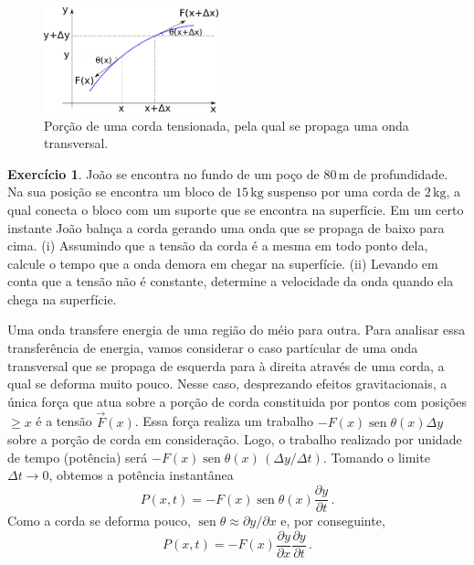 \documentclass[twocolumn=on,fontsize=12pt,DIV=calc]{scrartcl}
\theoremstyle{definition}
\newtheorem{ex}{Exercício}[section]
\DeclareMathOperator{\sen}{sen}
\begin{document}
\begin{figure}[ht]
  \centering
  \includegraphics[width=0.45\textwidth,keepaspectratio]{aux/ondavelocidade.pdf}
  \caption{Porção de uma corda tensionada, pela qual se propaga uma
    onda transversal.}
  \label{fig:ondavelocidade}
\end{figure}

\begin{ex}
  \label{ex:ondapoco}
  João se encontra no fundo de um poço de $80\,\mathrm{m}$ de
  profundidade. Na sua posição se encontra um bloco de
  $15\,\mathrm{kg}$ suspenso por uma corda de $2\,\mathrm{kg}$, a qual
  conecta o bloco com um suporte que se encontra na superfície. Em um
  certo instante João balnça a corda gerando uma onda que se propaga
  de baixo para cima. (i) Assumindo que a tensão da corda é a mesma em
  todo ponto dela, calcule o tempo que a onda demora em chegar na
  superfície. (ii) Levando em conta que a tensão não é constante,
  determine a velocidade da onda quando ela chega na superfície.
\end{ex}

Uma onda transfere energia de uma região do méio para outra. Para
analisar essa transferência de energia, vamos considerar o caso
partícular de uma onda transversal que se propaga de esquerda para à
direita através de uma corda, a qual se deforma muito pouco. Nesse
caso, desprezando efeitos gravitacionais, a única força que atua sobre
a porção de corda constituida por pontos com posições $\ge x$ é a
tensão $\vec F(x)$. Essa força realiza um trabalho
$-F(x)\sen\theta(x)\Delta y$ sobre a porção de corda em
consideração. Logo, o trabalho realizado por unidade de tempo
(potência) será $-F(x)\sen\theta(x)\,(\Delta y/\Delta t)$. Tomando o
limite $\Delta t\to 0$, obtemos a potência instantânea
$$P(x,t)=-F(x)\sen\theta(x)\frac{\partial y}{\partial t}\,.$$
Como a corda se deforma pouco,
$\sen\theta\approx \partial y/\partial x$ e, por conseguinte,
\begin{equation}
  \label{eq:35}
  P(x,t)=-F(x)\frac{\partial y}{\partial x}\frac{\partial y}{\partial t}\,.
\end{equation}
\end{document}
